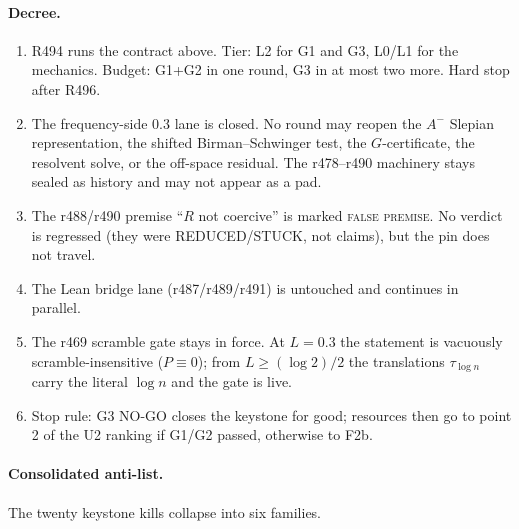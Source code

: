 \documentclass[11pt]{article}
\theoremstyle{remark}
\begin{document}
\paragraph{Decree.}
\begin{enumerate}
\item R494 runs the contract above.  Tier: L2 for G1 and G3,
L0/L1 for the mechanics.  Budget: G1+G2 in one round, G3 in at
most two more.  Hard stop after R496.
\item The frequency-side $0.3$ lane is closed.  No round may
reopen the $A^-$ Slepian representation, the shifted
Birman--Schwinger test, the $G$-certificate, the resolvent
solve, or the off-space residual.  The r478--r490 machinery
stays sealed as history and may not appear as a pad.
\item The r488/r490 premise ``$R$ not coercive'' is marked
\textsc{false premise}.  No verdict is regressed (they were
REDUCED/STUCK, not claims), but the pin does not travel.
\item The Lean bridge lane (r487/r489/r491) is untouched and
continues in parallel.
\item The r469 scramble gate stays in force.  At $L=0.3$ the
statement is vacuously scramble-insensitive ($P\equiv0$);
from $L\ge(\log2)/2$ the translations $\tau_{\log n}$ carry the
literal $\log n$ and the gate is live.
\item Stop rule: G3 NO-GO closes the keystone for good;
resources then go to point 2 of the U2 ranking if G1/G2 passed,
otherwise to F2b.
\end{enumerate}

\paragraph{Consolidated anti-list.}
The twenty keystone kills collapse into six families.
\end{document}

